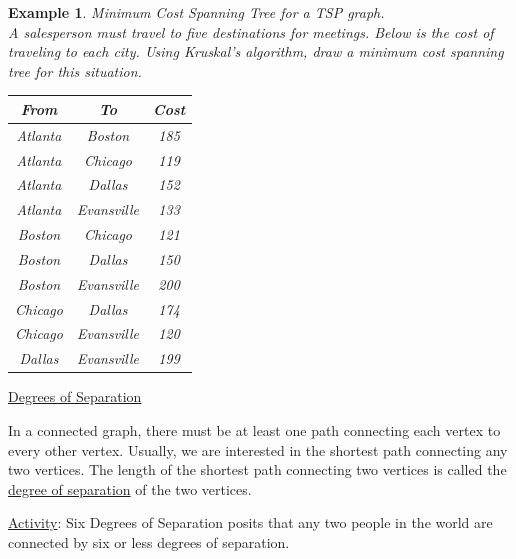 \documentclass[12pt]{article}
\newtheorem{ex}{Example}
\begin{document}
\pagebreak


\begin{ex} Minimum Cost Spanning Tree for a TSP graph.\\

A salesperson must travel to five destinations for meetings. Below is the cost of traveling to each city. Using Kruskal's algorithm, draw a minimum cost spanning tree for this situation. \\

\begin{tabular}{|c|c|c|} \hline

From	&	To		&	Cost \\ \hline
Atlanta	&	Boston	&	185   \\ \hline
Atlanta	&	Chicago	&	119   \\ \hline
Atlanta	&	Dallas	&	152   \\ \hline
Atlanta	&	Evansville	&	133   \\ \hline
Boston	&	Chicago	&	121   \\ \hline
Boston	&	Dallas	&	150   \\ \hline
Boston	&	Evansville	&	200   \\ \hline
Chicago	&	Dallas	&	174   \\ \hline
Chicago	&	Evansville	&	120   \\ \hline
Dallas	&	Evansville	&	199   \\ \hline

\end{tabular}
\end{ex}
\vfill


\begin{center}
\underline{Degrees of Separation}
\end{center}

In a connected graph, there must be at least one path connecting each vertex to every other vertex. Usually, we are interested in the shortest path connecting any two vertices. The length of the shortest path connecting two vertices is called the \underline{degree of separation} of the two vertices.

\vspace{.1in}

\underline{Activity}: Six Degrees of Separation posits that any two people in the world are connected by six or less degrees of separation.

\vspace{.1in}
\end{document}
